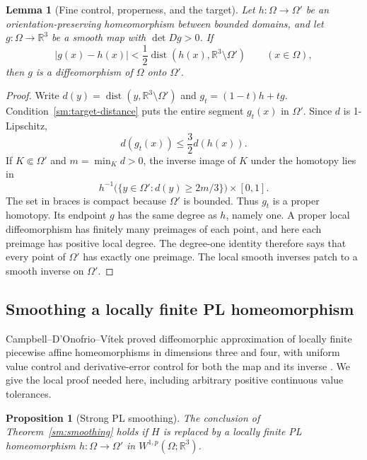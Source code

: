 \documentclass[11pt]{article}
\numberwithin{equation}{section}
\newtheorem{lemma}[theorem]{Lemma}
\newtheorem{proposition}[theorem]{Proposition}
\theoremstyle{definition}
\theoremstyle{remark}
\begin{document}
\begin{lemma}[Fine control, properness, and the target]
\label{sm:proper-degree}
Let $h:\Omega\to\Omega'$ be an orientation-preserving homeomorphism
between bounded domains, and let $g:\Omega\to\mathbb R^3$ be a smooth
map with $\det Dg>0$.  If
\begin{equation}
 \label{sm:target-distance}
 |g(x)-h(x)|<\frac12\operatorname{dist}(h(x),\mathbb R^3\setminus\Omega')
 \qquad(x\in\Omega),
\end{equation}
then $g$ is a diffeomorphism of $\Omega$ onto $\Omega'$.
\end{lemma}

\begin{proof}
Write $d(y)=\operatorname{dist}(y,\mathbb R^3\setminus\Omega')$ and
$g_t=(1-t)h+tg$.  Condition~\eqref{sm:target-distance} puts the entire
segment $g_t(x)$ in $\Omega'$.  Since $d$ is 1-Lipschitz,
\[
 d(g_t(x))\le\frac32d(h(x)).
\]
If $K\Subset\Omega'$ and $m=\min_Kd>0$, the inverse image of $K$
under the homotopy lies in
\[
 h^{-1}\bigl(\{y\in\Omega':d(y)\ge2m/3\}\bigr)\times[0,1].
\]
The set in braces is compact because $\Omega'$ is bounded.
Thus $g_t$ is a proper homotopy.  Its endpoint $g$ has the same
degree as $h$, namely one.  A proper local diffeomorphism has
finitely many preimages of each point, and here each preimage has
positive local degree.  The degree-one identity therefore says that
every point of $\Omega'$ has exactly one preimage.  The local smooth
inverses patch to a smooth inverse on $\Omega'$.
\end{proof}

\subsection{Smoothing a locally finite PL homeomorphism}

Campbell--D'Onofrio--V\'itek proved diffeomorphic approximation of
locally finite piecewise affine homeomorphisms in dimensions three
and four, with uniform value control and derivative-error control
for both the map and its inverse
\cite[Theorem~A]{CampbellDOnofrioVitek2026}.
We give the local proof needed here, including arbitrary positive
continuous value tolerances.

\begin{proposition}[Strong PL smoothing]
\label{sm:pl-smoothing}
The conclusion of Theorem~\ref{sm:smoothing} holds if $H$ is replaced
by a locally finite PL homeomorphism
$h:\Omega\to\Omega'$ in $W^{1,p}(\Omega;\mathbb R^3)$.
\end{proposition}
\end{document}
